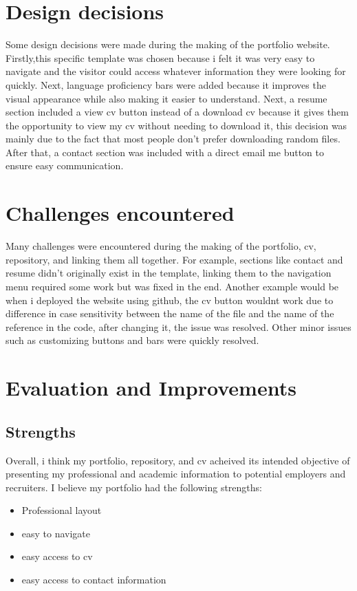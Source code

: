 \documentclass{article}
\begin{document}
\section{Design decisions}
Some design decisions were made during the making of the portfolio website.
Firstly,this specific template was chosen because i felt it was very easy to navigate and the visitor could access whatever information they were looking for quickly.
Next, language proficiency bars were added because it improves the visual appearance while also making it easier to understand. Next, a resume section included a view cv button instead of a download cv because it gives them the opportunity to view my cv without needing to download it, this decision was mainly due to the fact that most people don't prefer downloading random files. After that, a contact section was included with a direct email me button to ensure easy communication.
\section{Challenges encountered}
Many challenges were encountered during the making of the portfolio, cv, repository, and linking them all together. For example, sections like contact and resume didn't originally exist in the template, linking them to the navigation menu required some work but was fixed in the end. Another example would be when i deployed the website using github, the cv button wouldnt work due to difference in case sensitivity between the name of the file and the name of the reference in the code, after changing it, the issue was resolved. Other minor issues such as customizing buttons and bars were quickly resolved.
\section{Evaluation and Improvements}
\subsection{Strengths}
Overall, i think my portfolio, repository, and cv acheived its intended objective of presenting my professional and academic information to potential employers and recruiters. I believe my portfolio had the following strengths:
\begin{itemize}
    \item Professional layout
    \item easy to navigate
    \item easy access to cv
    \item easy access to contact information
\end{itemize}
\end{document}
